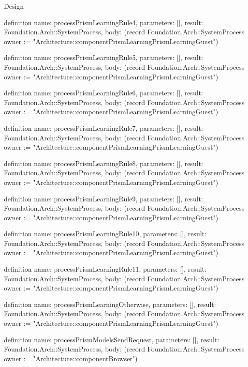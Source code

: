\begin{lexlean}{Design}
\begin{semanticmodule}
definition{
  name: processPrismLearningRule4,
  parameters: [],
  result: Foundation.Arch::SystemProcess,
  body: (record Foundation.Arch::SystemProcess {owner := "Architecture::componentPrismLearningPrismLearningGuest"})
}

definition{
  name: processPrismLearningRule5,
  parameters: [],
  result: Foundation.Arch::SystemProcess,
  body: (record Foundation.Arch::SystemProcess {owner := "Architecture::componentPrismLearningPrismLearningGuest"})
}

definition{
  name: processPrismLearningRule6,
  parameters: [],
  result: Foundation.Arch::SystemProcess,
  body: (record Foundation.Arch::SystemProcess {owner := "Architecture::componentPrismLearningPrismLearningGuest"})
}

definition{
  name: processPrismLearningRule7,
  parameters: [],
  result: Foundation.Arch::SystemProcess,
  body: (record Foundation.Arch::SystemProcess {owner := "Architecture::componentPrismLearningPrismLearningGuest"})
}

definition{
  name: processPrismLearningRule8,
  parameters: [],
  result: Foundation.Arch::SystemProcess,
  body: (record Foundation.Arch::SystemProcess {owner := "Architecture::componentPrismLearningPrismLearningGuest"})
}

definition{
  name: processPrismLearningRule9,
  parameters: [],
  result: Foundation.Arch::SystemProcess,
  body: (record Foundation.Arch::SystemProcess {owner := "Architecture::componentPrismLearningPrismLearningGuest"})
}

definition{
  name: processPrismLearningRule10,
  parameters: [],
  result: Foundation.Arch::SystemProcess,
  body: (record Foundation.Arch::SystemProcess {owner := "Architecture::componentPrismLearningPrismLearningGuest"})
}

definition{
  name: processPrismLearningRule11,
  parameters: [],
  result: Foundation.Arch::SystemProcess,
  body: (record Foundation.Arch::SystemProcess {owner := "Architecture::componentPrismLearningPrismLearningGuest"})
}

definition{
  name: processPrismLearningOtherwise,
  parameters: [],
  result: Foundation.Arch::SystemProcess,
  body: (record Foundation.Arch::SystemProcess {owner := "Architecture::componentPrismLearningPrismLearningGuest"})
}

definition{
  name: processPrismModelsSendRequest,
  parameters: [],
  result: Foundation.Arch::SystemProcess,
  body: (record Foundation.Arch::SystemProcess {owner := "Architecture::componentBrowser"})
}


\end{semanticmodule}
\end{lexlean}
